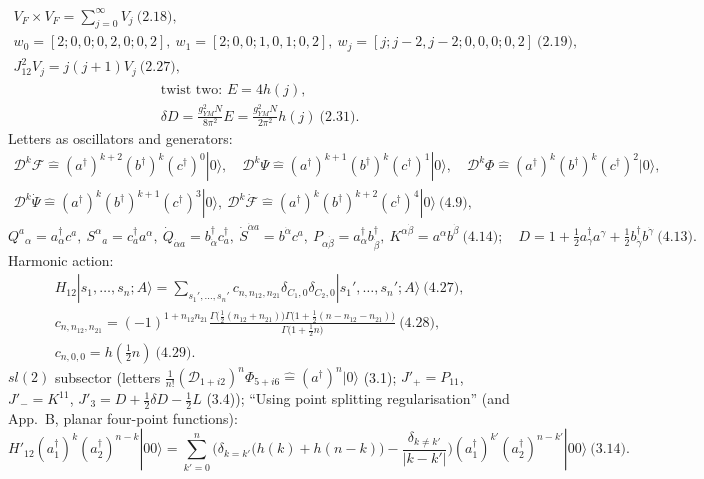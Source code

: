\documentclass[10pt]{article}
\begin{document}
\begin{gather*}
V_F\times V_F=\sum_{j=0}^\infty V_j\ \text{(2.18)},\\ w_0=[2;0,0;0,2,0;0,2],\ w_1=[2;0,0;1,0,1;0,2],\ w_j=[j;j-2,j-2;0,0,0;0,2]\ \text{(2.19)},\\ J_{12}^2V_j=j(j+1)V_j\ \text{(2.27)},
\end{gather*}
\begin{gather*}
\text{twist two: } E=4h(j),\\ \delta D=\frac{g_{YM}^2N}{8\pi^2}E=\frac{g_{YM}^2N}{2\pi^2}h(j)\ \text{(2.31)}.
\end{gather*}
Letters as oscillators and generators:
\begin{gather*}
\mathcal D^k\mathcal F\hat=(a^\dagger)^{k+2}(b^\dagger)^k(c^\dagger)^0|0\rangle,\quad \mathcal D^k\Psi\hat=(a^\dagger)^{k+1}(b^\dagger)^k(c^\dagger)^1|0\rangle,\quad \mathcal D^k\Phi\hat=(a^\dagger)^k(b^\dagger)^k(c^\dagger)^2|0\rangle,\\ \mathcal D^k\dot\Psi\hat=(a^\dagger)^k(b^\dagger)^{k+1}(c^\dagger)^3|0\rangle,\ \mathcal D^k\dot{\mathcal F}\hat=(a^\dagger)^k(b^\dagger)^{k+2}(c^\dagger)^4|0\rangle\ \text{(4.9)},
\end{gather*}
\begin{equation*}
Q^a{}_\alpha=a^\dagger_\alpha c^a,\ S^\alpha{}_a=c^\dagger_aa^\alpha,\ \dot Q_{\dot\alpha a}=b^\dagger_{\dot\alpha}c^\dagger_a,\ \dot S^{\dot\alpha a}=b^{\dot\alpha}c^a,\ P_{\alpha\dot\beta}=a^\dagger_\alpha b^\dagger_{\dot\beta},\ K^{\alpha\dot\beta}=a^\alpha b^{\dot\beta}\ \text{(4.14)};\quad D=1+\tfrac12a^\dagger_\gamma a^\gamma+\tfrac12b^\dagger_{\dot\gamma}b^{\dot\gamma}\ \text{(4.13)}.
\end{equation*}
Harmonic action:
\begin{gather*}
H_{12}|s_1,\dots,s_n;A\rangle=\sum_{s_1',\dots,s_n'}c_{n,n_{12},n_{21}}\delta_{C_1,0}\delta_{C_2,0}|s_1',\dots,s_n';A\rangle\ \text{(4.27)},\\ c_{n,n_{12},n_{21}}=(-1)^{1+n_{12}n_{21}}\frac{\Gamma\big(\frac12(n_{12}+n_{21})\big)\Gamma\big(1+\frac12(n-n_{12}-n_{21})\big)}{\Gamma\big(1+\frac12n\big)}\ \text{(4.28)},\\ c_{n,0,0}=h(\tfrac12n)\ \text{(4.29)}.
\end{gather*}
$sl(2)$ subsector (letters $\frac1{n!}(\mathcal D_{1+i2})^n\Phi_{5+i6}\hat=(a^\dagger)^n|0\rangle$ (3.1); $J'_+=P_{11}$, $J'_-=K^{11}$, $J'_3=D+\frac12\delta D-\frac12L$ (3.4)); ``Using point splitting regularisation'' (and App.\ B, planar four-point functions):
\begin{equation*}
H'_{12}(a_1^\dagger)^k(a_2^\dagger)^{n-k}|00\rangle=\sum_{k'=0}^n\Big(\delta_{k=k'}\big(h(k)+h(n-k)\big)-\frac{\delta_{k\neq k'}}{|k-k'|}\Big)(a_1^\dagger)^{k'}(a_2^\dagger)^{n-k'}|00\rangle\ \text{(3.14)}.
\end{equation*}
\end{document}
